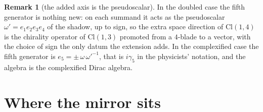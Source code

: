 \documentclass[11pt]{article}
\theoremstyle{definition}
\newtheorem{remark}[theorem]{Remark}
\theoremstyle{plain}
\providecommand{\Cl}{}\renewcommand{\Cl}{\mathrm{Cl}}
\begin{document}
\begin{remark}[the added axis is the pseudoscalar]\label{c:note.odd-extensions.added-axis-pseudoscalar}
In the doubled case the fifth generator is nothing new: on each summand it acts as the pseudoscalar $\omega' = e_{1}e_{2}e_{3}e_{4}$ of the shadow, up to sign, so the extra space direction of $\Cl(1,4)$ is the chirality operator of $\Cl(1,3)$ promoted from a $4$-blade to a vector, with the choice of sign the only datum the extension adds. In the complexified case the fifth generator is $e_{5} = \pm\,\omega\,\omega'^{-1}$, that is $i\gamma_{5}$ in the physicists' notation, and the algebra is the complexified Dirac algebra.
\end{remark}

\section{Where the mirror sits}
\end{document}
